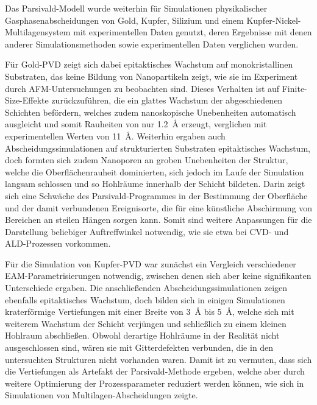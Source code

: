 
Das Parsivald-Modell wurde weiterhin für Simulationen physikalischer Gasphasenabscheidungen von Gold, Kupfer, Silizium und einem Kupfer-Nickel-Multilagensystem mit experimentellen Daten genutzt, deren Ergebnisse mit denen anderer Simulationsmethoden sowie experimentellen Daten verglichen wurden.

Für Gold-PVD zeigt sich dabei epitaktisches Wachstum auf monokristallinen Substraten, das keine Bildung von Nanopartikeln zeigt, wie sie im Experiment durch AFM-Untersuchungen zu beobachten sind.
Dieses Verhalten ist auf Finite-Size-Effekte zurückzuführen, die ein glattes Wachstum der abgeschiedenen Schichten befördern, welches zudem nanoskopische Unebenheiten automatisch ausgleicht und somit Rauheiten von nur \SI{1.2}{\angstrom} erzeugt, verglichen mit experimentellen Werten von \SI{11}{\angstrom}.
Weiterhin ergaben auch Abscheidungssimulationen auf strukturierten Substraten epitaktisches Wachstum, doch formten sich zudem Nanoporen an groben Unebenheiten der Struktur, welche die Oberflächenrauheit dominierten, sich jedoch im Laufe der Simulation langsam schlossen und so Hohlräume innerhalb der Schicht bildeten.
Darin zeigt sich eine Schwäche des Parsivald-Programmes in der Bestimmung der Oberfläche und der damit verbundenen Ereignisorte, die für eine künstliche Abschirmung von Bereichen an steilen Hängen sorgen kann.
Somit sind weitere Anpassungen für die Darstellung beliebiger Auftreffwinkel notwendig, wie sie etwa bei CVD- und ALD-Prozessen vorkommen.


Für die Simulation von Kupfer-PVD war zunächst ein Vergleich verschiedener EAM-Para\-metri\-sierungen notwendig, zwischen denen sich aber keine signifikanten Unterschiede ergaben.
Die anschließenden Abscheidungssimulationen zeigen ebenfalls epitaktisches Wachstum, doch bilden sich in einigen Simulationen kraterförmige Vertiefungen mit einer Breite von \SI{3}{\angstrom} bis \SI{5}{\angstrom}, welche sich mit weiterem Wachstum der Schicht verjüngen und schließlich zu einem kleinen Hohlraum abschließen.
Obwohl derartige Hohlräume in der Realität nicht ausgeschlossen sind, wären sie mit Gitterdefekten verbunden, die in den untersuchten Strukturen nicht vorhanden waren.
Damit ist zu vermuten, dass sich die Vertiefungen als Artefakt der Parsivald-Methode ergeben, welche aber durch weitere Optimierung der Prozessparameter reduziert werden können, wie sich in Simulationen von Multilagen-Abscheidungen zeigte.


